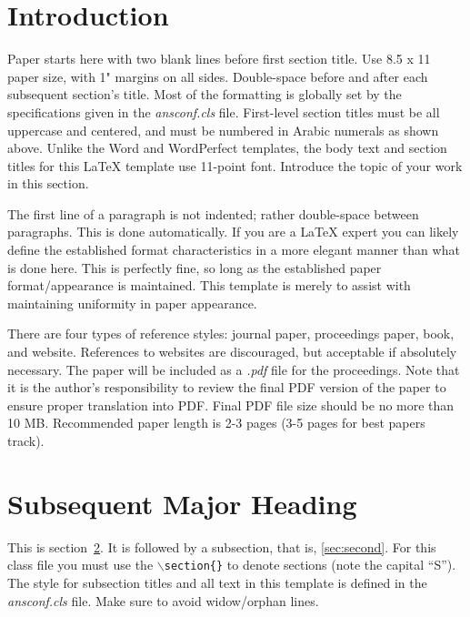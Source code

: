 \documentclass{ansconf}
\begin{document}
\begin{multicols}{2}

\section{Introduction}

Paper starts here with two blank lines before first section title.  Use 
8.5 x 11 paper size, with 1" margins on all sides.  Double-space before and
after each subsequent section's title.  Most of the formatting is globally
set by the specifications given in the {\it ansconf.cls} file.  
First-level section titles must be all uppercase and centered, and must 
be numbered in Arabic numerals as shown above.  Unlike the Word and WordPerfect
templates, the body text and section titles for this {\LaTeX} template use 
11-point font.  Introduce the topic of 
your work in this section.

The first line of a paragraph is not indented; rather double-space between 
paragraphs.  This is done automatically. If you are a {\LaTeX} expert you 
can likely define the established format characteristics in a more elegant 
manner than what is done here.  This is perfectly fine, so long as the 
established paper format/appearance is maintained.  This template is merely 
to assist with maintaining uniformity in paper appearance.

There are four types of reference styles: journal paper\cite{journal},
proceedings paper\cite{proc_paper}, book\cite{book}, and website\cite{techrep}.
References to websites are discouraged, but acceptable if absolutely necessary.
The paper will be included as a {\it .pdf} file for the proceedings. Note that
it is the author's responsibility to review the final PDF version of the paper
to ensure proper translation into PDF.  Final PDF file size should be no more
than 10 MB. Recommended paper length is 2-3 pages (3-5 pages for best papers track).

\section{Subsequent Major Heading}
\label{sec:first}

This is section~\ref{sec:first}. It is followed by a subsection, that is, 
\ref{sec:second}. For this class file you must use the 
\texttt{$\backslash$section\{\}} to denote sections (note the capital ``S'').  
The style for subsection titles and all text in this template is defined in 
the {\it ansconf.cls} file.  Make sure to avoid widow/orphan lines.



\end{multicols}
\end{document}
